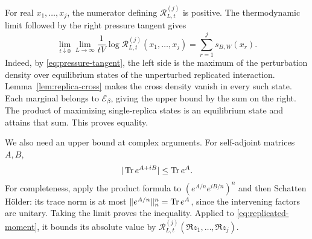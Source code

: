 For real $x_1,\ldots,x_j$, the numerator defining
$\mathcal R^{(j)}_{L,t}$ is positive.  The thermodynamic limit followed
by the right pressure tangent gives
\begin{equation}
 \lim_{t\downarrow0}\lim_{L\to\infty}
       \frac{1}{tV}\log\mathcal R^{(j)}_{L,t}(x_1,\ldots,x_j)
           =\sum_{r=1}^j s_{B,W}(x_r).
 \label{eq:real-replica-tangent}
\end{equation}
Indeed, by \eqref{eq:pressure-tangent}, the left side is the maximum
of the perturbation density over equilibrium states of the unperturbed
replicated interaction.  Lemma~\ref{lem:replica-cross} makes the cross
density vanish in every such state.  Each marginal belongs to
$\mathcal E_\beta$, giving the upper bound by the sum on the right.
The product of maximizing single-replica states is an equilibrium
state and attains that sum.  This proves equality.

We also need an upper bound at complex arguments.  For self-adjoint
matrices $A,B$,
\begin{equation}
 |\operatorname{Tr} e^{A+iB}|\le\operatorname{Tr} e^A.
 \label{eq:complex-trace-bound}
\end{equation}
For completeness, apply the product formula to
$(e^{A/n}e^{iB/n})^n$ and then Schatten H\"older: its trace norm is at
most $\|e^{A/n}\|_n^n=\operatorname{Tr} e^A$, since the intervening factors are
unitary.  Taking the limit proves the inequality.  Applied to
\eqref{eq:replicated-moment}, it bounds its absolute value by
$\mathcal R^{(j)}_{L,t}(\Re z_1,\ldots,\Re z_j)$.

